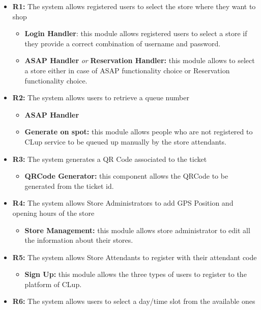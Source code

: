 \documentclass[table, 12pt]{article}
\begin{document}
\begin{itemize}
    \item \textbf{R1:} The system allows registered users to select the store where they want to shop
          \begin{itemize}
              \item \textbf{Login Handler}: this module allows registered users to select a store if they provide a correct combination of username and password.
              \item \textbf{ASAP Handler} \textit{or} \textbf{Reservation Handler:} this module allows to select a store either in case of ASAP functionality choice or Reservation functionality choice.
          \end{itemize}
    \item \textbf{R2:} The system allows users to retrieve a queue number
          \begin{itemize}
              \item \textbf{ASAP Handler}
              \item \textbf{Generate on spot:} this module allows people who are not registered to CLup service to be queued up manually by the store attendants.
          \end{itemize}
    \item \textbf{R3:} The system generates a QR Code associated to the ticket
          \begin{itemize}
              \item \textbf{QRCode Generator:} this component allows the QRCode to be generated from the ticket id.
          \end{itemize}
    \item \textbf{R4:} The system allows Store Administrators to add GPS Position and opening hours of the store
          \begin{itemize}
              \item \textbf{Store Management:} this module allows store administrator to edit all the information about their stores.
          \end{itemize}
    \item \textbf{R5:} The system allows Store Attendants to register with their attendant code
          \begin{itemize}
              \item \textbf{Sign Up:} this module allows the three types of users to register to the platform of CLup.
          \end{itemize}
    \item \textbf{R6:} The system allows users to select a day/time slot from the available ones

\end{itemize}
\end{document}
